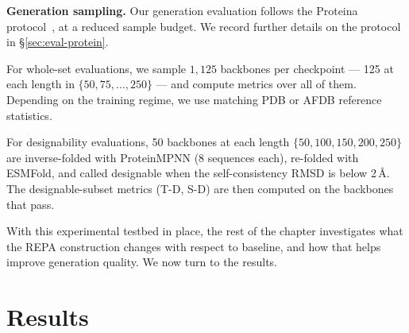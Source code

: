 \documentclass[12pt,a4paper,twoside]{report}
\begin{document}
\textbf{Generation sampling.} Our generation evaluation follows the Proteina protocol~\cite{Proteina}, at a reduced sample budget. We record further details on the protocol in \S\ref{sec:eval-protein}.

For whole-set evaluations, we sample $1{,}125$ backbones per checkpoint --- 125 at each length in $\{50, 75, \dots, 250\}$ --- and compute metrics over all of them. Depending on the training regime, we use matching PDB or AFDB reference statistics.

For designability evaluations, 50 backbones at each length $\{50, 100, 150, 200, 250\}$ are inverse-folded with ProteinMPNN (8 sequences each), re-folded with ESMFold, and called designable when the self-consistency RMSD is below 2\,\AA{}. The designable-subset metrics (T-D, S-D) are then computed on the backbones that pass.

With this experimental testbed in place, the rest of the chapter investigates what the REPA construction changes with respect to baseline, and how that helps improve generation quality. We now turn to the results.

\section{Results}
\end{document}
